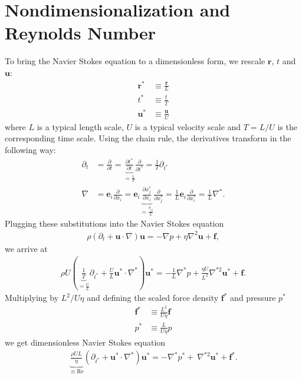 \documentclass[a4paper,10pt,bibtotoc]{scrartcl}
\begin{document}
\section{Nondimensionalization and Reynolds Number}
To bring the Navier Stokes equation to a dimensionless form, we rescale $\mathbf{r}$, $t$ and $\mathbf{u}$:
\begin{align}
 \mathbf{r}^* & \equiv \frac{\mathbf{r}}{L}\\
 t^* &\equiv \frac{t}{T}\\
 \mathbf{u}^* &\equiv \frac{\mathbf{u}}{U}
\end{align}
where $L$ is a typical length scale, $U$ is a typical velocity scale and $T=L/U$ is the corresponding time scale. Using the chain rule, the derivatives transform in the following way:
\begin{align}
 \partial_t &= \frac{\partial}{\partial t} = \underbrace{\frac{\partial t^*}{\partial t}}_{=\frac{1}{T}} \frac{\partial}{\partial t^*}= \frac{1}{T}\partial_{t^*}\\
 \nabla &= \mathbf{e}_i\frac{\partial}{\partial x_i} = \mathbf{e}_i\underbrace{\frac{\partial x_j^*}{\partial x_i}}_{=\frac{\delta_{ij}}{L}} \frac{\partial}{\partial x_j^*} = \frac{1}{L}\mathbf{e}_i\frac{\partial}{\partial x_i^*} = \frac{1}{L}\nabla^*.
\end{align}
Plugging these substitutions into the Navier Stokes equation
\begin{align}
 \rho\left(\partial_t + \mathbf{u}\cdot \nabla\right)\mathbf{u} = -\nabla p + \eta \nabla ^2 \mathbf{u} + \mathbf{f},
\end{align}
we arrive at
\begin{align}
 \rho U\left(\underbrace{\frac{1}{T}}_{=\frac{U}{L}}\partial_{t^*} + \frac{U}{L}\mathbf{u}^*\cdot \nabla^*\right)\mathbf{u}^* = -\frac{1}{L}\nabla^* p + \frac{\eta U}{L^2} \nabla^{*2} \mathbf{u}^* + \mathbf{f}.
\end{align}
Multiplying by $L^2 / U\eta$ and defining the scaled force density $\mathbf{f}^*$ and pressure $p^*$
\begin{align}
\mathbf{f}^* &\equiv \frac{L^2 }{U \eta}\mathbf{f}\\
p ^* &\equiv \frac{L }{U\eta}p
\end{align}
we get dimensionless Navier Stokes equation
\begin{align}
 \underbrace{\frac{\rho U L}{\eta}}_{\equiv \mathrm{Re}}\left(\partial_{t^*} + \mathbf{u}^*\cdot \nabla^*\right)\mathbf{u}^* = -\nabla^* p^* + \ \nabla^{*2} \mathbf{u}^* + \mathbf{f}^*.
\end{align}
\end{document}
